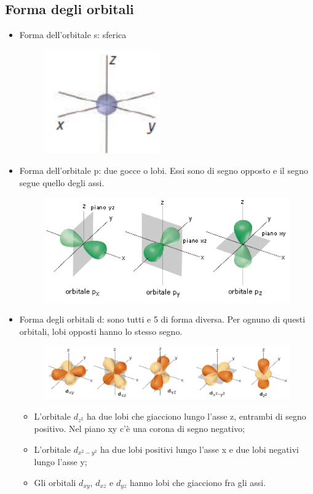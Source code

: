 \subsection{Forma degli orbitali}
\begin{itemize}
  \item Forma dell'orbitale s: sferica
  \begin{figure}[htp]
    \centering
    \includegraphics[width=5cm]{immagini/orbitale-s.png}
  \end{figure}
  \item Forma dell'orbitale p: due gocce o lobi. Essi sono di segno opposto e il segno segue quello degli assi.
  \begin{figure}[htp]
    \centering
    \includegraphics[width=12cm]{immagini/orbitale-p.png}
  \end{figure}
  \item Forma degli orbitali d: sono tutti e 5 di forma diversa. Per ognuno di questi orbitali, lobi opposti hanno lo stesso segno.
  \begin{figure}[htp]
    \centering
    \includegraphics[width=16cm]{immagini/orbitale-d.png}
  \end{figure}
  \begin{itemize}
    \item L'orbitale $d_{z^2}$ ha due lobi che giacciono lungo l'asse z, entrambi di segno positivo. Nel piano xy c'è una corona di segno negativo;
    \item L'orbitale $d_{x^2-y^2}$ ha due lobi positivi lungo l'asse x e due lobi negativi lungo l'asse y;
    \item Gli orbitali $d_{xy}$, $d_{xz}$ e $d_{yz}$ hanno lobi che giacciono fra gli assi.
  \end{itemize}
\end{itemize}

